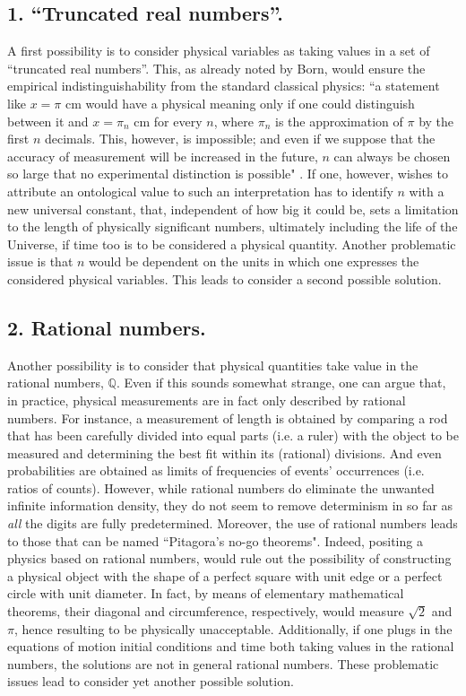 \documentclass[aps,prl,twocolumn,showpacs,superscriptaddress,groupedaddress, nofootinbib]{revtex4-1}
\newcommand{\Q}{\mathbb{Q}}
\begin{document}
\subsection{1. ``Truncated real numbers''.} A first possibility is to consider physical variables as taking values in a set of ``truncated real numbers''. This, as already noted by Born, would ensure the empirical indistinguishability from the standard classical physics: ``a statement like $x = \pi$ cm would have a physical meaning only if one could distinguish between it and $x = \pi_n$ cm for every $n$, where $\pi_n$ is the approximation of $\pi$ by the first $n$ decimals. This, however, is impossible; and even if we suppose that the accuracy of measurement will be increased in the future, $n$ can always be chosen so large that no experimental distinction is possible" \cite{born}. If one, however, wishes to attribute an ontological value to such an interpretation has to identify  $n$ with a new universal constant, that, independent of how big it could be, sets a limitation to the length of physically significant numbers, ultimately including the life of the Universe, if time too is to be considered a physical quantity. Another problematic issue is that $n$ would be dependent on the units in which one expresses the considered physical variables. This leads to consider a second possible solution.

\subsection{2. Rational numbers.} Another possibility is to consider that physical quantities take value in the rational numbers, $\Q$. Even if this sounds somewhat strange, one can argue that, in practice, physical measurements are in fact only described by rational numbers. For instance, a measurement of length is obtained by comparing a rod that has been carefully divided into equal parts (i.e. a ruler) with the object to be measured and determining the best fit within its (rational) divisions. And even probabilities are obtained as limits of frequencies of events' occurrences  (i.e. ratios of counts). However, while rational numbers do eliminate the unwanted infinite information density, they do not seem to remove determinism in so far as \emph{all} the digits are fully predetermined. Moreover, the use of rational numbers leads to those that can be named ``Pitagora's no-go theorems". Indeed, positing a physics based on rational numbers, would rule out the possibility of constructing a physical object with the shape of a perfect square with unit edge or a perfect circle with unit diameter. In fact, by means of elementary mathematical theorems, their diagonal  and circumference, respectively, would measure $\sqrt2$ and $\pi$, hence resulting to be physically unacceptable.
Additionally, if one plugs in the equations of motion initial conditions and time both taking values in the rational numbers, the solutions are not in general rational numbers.
These problematic issues lead to consider yet another possible solution.
\end{document}
